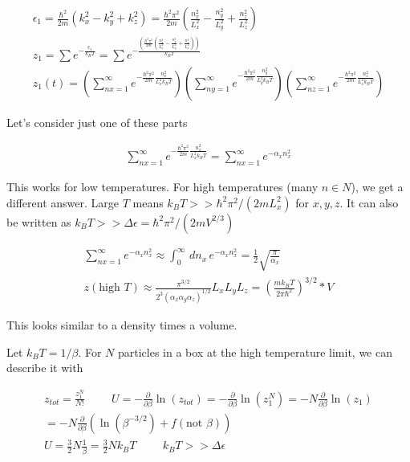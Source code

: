 \documentclass[fleqn]{report}
\newcommand{\hp}{\hspace{1cm}}
\newcommand{\del}{\partial}
\newcommand{\equations} [1] {
\begin{gather*}
#1
\end{gather*}
}
\begin{document}
\equations{
    \epsilon_1
    =
    \frac{\hbar^2}{2m}
    (k_x^2 - k_y^2 + k_z^2)
    =
    \frac{\hbar^2 \pi^2}{2m}
    (\frac{n_x^2}{L_x^2} - \frac{n_y^2}{L_y^2} + \frac{n_z^2}{L_z^2})
    \\
    z_1 
    =
    \sum e^{-\frac{\epsilon_1}{k_B T}}
    =
    \sum e^{-\frac{
        \left(
            \frac{\hbar^2 \pi^2}{2m}
            (\frac{n_x^2}{L_x^2} - \frac{n_y^2}{L_y^2} + \frac{n_z^2}{L_z^2})
        \right)
    }{k_B T}}
    \\
    z_1(t)
    = 
    \left(
        \sum_{nx=1}^{\infty}
        e^{
            - \frac{\hbar^2 \pi^2}{2m}
            \frac{n_x^2}{L_x^2 k_B T}
        }
    \right)
    \left(
        \sum_{ny=1}^{\infty}
        e^{
            - \frac{\hbar^2 \pi^2}{2m}
            \frac{n_y^2}{L_y^2 k_B T}
        }
    \right)
    \left(
        \sum_{nz=1}^{\infty}
        e^{
            - \frac{\hbar^2 \pi^2}{2m}
            \frac{n_z^2}{L_z^2 k_B T}
        }
    \right)
}

Let's consider just one of these parts 
\equations{
    \sum_{nx=1}^{\infty}
    e^{
        - \frac{\hbar^2 \pi^2}{2m}
        \frac{n_x^2}{L_x^2 k_B T}
    }
    =
    \sum_{nx=1}^{\infty}
    e^{
        -\alpha_x n_x^2
    }
}

This works for low temperatures. For high temperatures (many $n \in N$), 
we get a different answer. Large $T$ means $k_B T >> \hbar^2 \pi^2 / (2m L_x^2)$
for $x, y, z$. It can also be written as 
$k_B T >> \Delta \epsilon = \hbar^2 \pi^2 / (2m V^{2/3})$

\equations{
    \sum_{nx=1}^{\infty}
    e^{
        -\alpha_x n_x^2
    }
    \approx 
    \int^\infty_{0}
    \, dn_x \, 
    e^{- \alpha_x n_x^2}
    =
    \frac{1}{2}
    \sqrt{\frac{\pi}{\alpha_x}}
    \\
    z(\textrm{high $T$})
    \approx 
    \frac{\pi^{3/2}}{2^3 (\alpha_x \alpha_y \alpha_z)^{1/2}}
    L_x L_y L_z 
    =
    \left(
        \frac{m k_B T}{2 \pi \hbar^2}
    \right)^{3/2}
    * V
}

This looks similar to a density times a volume.

Let $k_B T = 1/\beta$. For $N$ particles in a box at the high temperature limit, we can describe 
it with

\equations{
    z_{tot}
    =
    \frac{z_1^N}{N!}
    \hp
    U 
    =
    -
    \frac{\del}{\del \beta} \ln(z_{tot})
    =
    -\frac{\del}{\del \beta} \ln(z_{1}^N)
    =
    -N\frac{\del}{\del \beta} \ln(z_{1})
    \\
    =
    - N \frac{\del}{\del \beta}
    \left(
        \ln(\beta^{-3/2})
        +
        f(\textrm{not } \beta)
    \right)
    \\
    U 
    =
    \frac{3}{2}
    N \frac{1}{\beta}
    =
    \frac{3}{2}
    N k_B T 
    \hp 
    k_B T 
    >> 
    \Delta \epsilon
}
\end{document}
